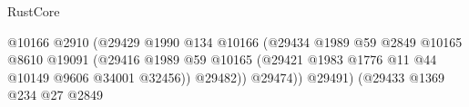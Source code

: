 \begin{lexlean}{RustCore}
\begin{coremodule}
                                                                    @10166
                                                                    @2910
                                                                    (@29429
                                                                      @1990
                                                                      @134
                                                                      @10166
                                                                      (@29434
                                                                        @1989
                                                                        @59
                                                                        @2849
                                                                        @10165
                                                                        @8610
                                                                        @19091
                                                                        (@29416
                                                                          @1989
                                                                          @59
                                                                          @10165
                                                                          (@29421
                                                                            @1983
                                                                            @1776
                                                                            @11
                                                                            @44
                                                                            @10149
                                                                            @9606
                                                                            @34001
                                                                            @32456))
                                                                        @29482))
                                                                    @29474))
                                                                @29491)
                                                              (@29433
                                                                @1369
                                                                @234
                                                                @27
                                                                @2849

\end{coremodule}
\end{lexlean}
